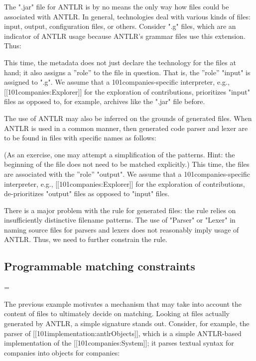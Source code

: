 The ".jar" file for ANTLR is by no means the only way how files could be associated with ANTLR. In general, technologies deal with various kinds of files: input, output, configuration files, or others. Consider ".g" files, which are an indicator of ANTLR usage because ANTLR's grammar files use this extension. Thus:



This time, the metadata does not just declare the technology for the files at hand; it also assigns a ''role'' to the file in question. That is, the ''role'' "input" is assigned to ".g". We assume that a 101companies-specific interpreter, e.g., [[101companies:Explorer]] for the exploration of contributions, prioritizes "input" files as opposed to, for example, archives like the ".jar" file before.

The use of ANTLR may also be inferred on the grounds of generated files. When ANTLR is used in a common manner, then generated code parser and lexer are to be found in files with specific names as follows:



(As an exercise, one may attempt a simplification of the patterns. Hint: the beginning of the file does not need to be matched explicitly.) This time, the files are associated with the ''role'' "output". We assume that a 101companies-specific interpreter, e.g., [[101companies:Explorer]] for the exploration of contributions, de-prioritizes "output" files as opposed to "input" files.

There is a major problem with the rule for generated files: the rule relies on insufficiently distinctive filename patterns. The use of "Parser" or "Lexer" in naming source files for parsers and lexers does not reasonably imply usage of ANTLR. Thus, we need to further constrain the rule.
\subsection{Programmable matching constraints}
=

The previous example motivates a mechanism that may take into account the content of files to ultimately decide on matching. Looking at files actually generated by ANTLR, a simple signature stands out. Consider, for example, the parser of [[101implementation:antlrObjects]], which is a simple ANTLR-based implementation of the [[101companies:System]]; it parses textual syntax for companies into objects for companies:

